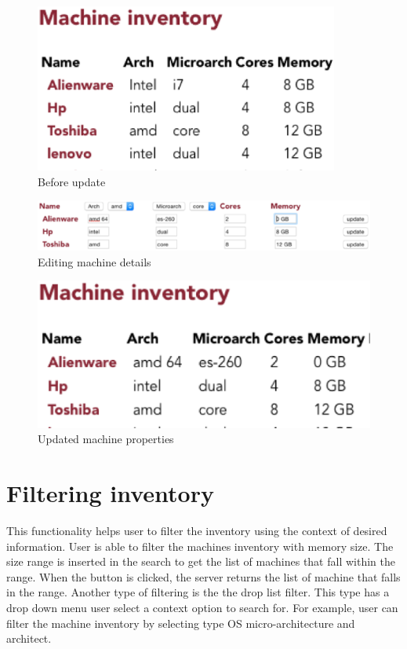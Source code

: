 \begin{figure}[h]
  \includegraphics[width=100mm, scale=0.5]{update.eps}
  \caption{Before update}
  \label{update}
\end{figure}
\begin{figure}[h]
  \includegraphics[width=\linewidth]{change.eps}
  \caption{Editing machine details}
   \label{change}
\end{figure}
\begin{figure}[h]
  \includegraphics[width=\linewidth]{update2.eps}
  \caption{Updated machine properties}
  \label{update2}
\end{figure}

\pagebreak
\section*{Filtering inventory}
This functionality helps user to filter the inventory using the context of desired information. User is able to filter the machines inventory with memory size. The size range is inserted in the search to get the list of machines that fall within the range. When the button is clicked, the  server returns the list of machine that falls in the range. Another type of filtering is the the drop list filter. This type has a drop down menu user select a context option to search for. For example, user can filter the machine inventory by selecting type OS micro-architecture and architect.
\pagebreak
\pagebreak
